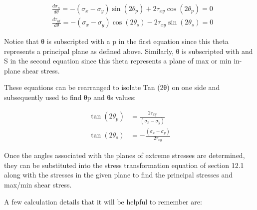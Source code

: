 \documentclass[
  letterpaper,
  DIV=11,
  numbers=noendperiod]{scrreprt}
\begin{document}
\[
\begin{aligned}
& \frac{d \sigma_n}{d \theta}=-\left(\sigma_x-\sigma_y\right) \sin \left(2 \theta_p\right)+2 \tau_{x y} \cos \left(2 \theta_p\right)=0 \\
& \frac{d \tau_{n t}}{d \theta}=-\left(\sigma_x-\sigma_y\right) \cos \left(2 \theta_s\right)-2 \tau_{x y} \sin \left(2 \theta_s\right)=0
\end{aligned}
\]

Notice that θ is subscripted with a p in the first equation since this
theta represents a principal plane as defined above. Similarly, θ is
subscripted with and S in the second equation since this theta
represents a plane of max or min in-plane shear stress.

These equations can be rearranged to isolate Tan (2θ) on one side and
subsequently used to find θp and θs values:

\[
\begin{aligned}
\tan \left(2 \theta_p\right) & =\frac{2 \tau_{x y}}{\left(\sigma_x-\sigma_y\right)} \\
\tan \left(2 \theta_s\right) & =-\frac{\left(\sigma_x-\sigma_y\right)}{2 \tau_{x y}}
\end{aligned}
\]

Once the angles associated with the planes of extreme stresses are
determined, they can be substituted into the stress transformation
equation of section 12.1 along with the stresses in the given plane to
find the principal stresses and max/min shear stress.

A few calculation details that it will be helpful to remember are:
\end{document}
